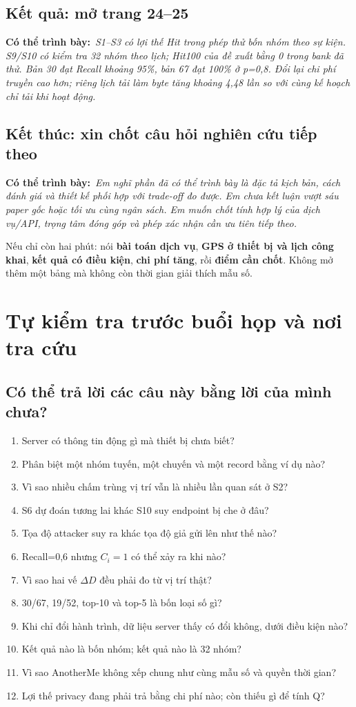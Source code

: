 \documentclass[10pt,a4paper]{article}
\newcommand{\key}[1]{\par\smallskip\noindent\colorbox{pale}{\parbox{\dimexpr\linewidth-2\fboxsep}{#1}}\par\smallskip}
\newcommand{\say}[1]{\par\textbf{Có thể trình bày:}\ \textit{#1}\par}
\newcommand{\guidepage}[1]{\clearpage\section{#1}}
\begin{document}
\subsection*{Kết quả: mở trang 24--25}
\say{S1--S3 có lợi thế Hit trong phép thử bốn nhóm theo sự kiện. S9/S10 có kiểm tra 32 nhóm theo lịch; Hit100 của đề xuất bằng 0 trong bank đã thử. Bản 30 đạt Recall khoảng 95\%, bản 67 đạt 100\% ở p=0,8. Đổi lại chi phí truyền cao hơn; riêng lịch tải làm byte tăng khoảng 4,48 lần so với cùng kế hoạch chỉ tải khi hoạt động.}

\subsection*{Kết thúc: xin chốt câu hỏi nghiên cứu tiếp theo}
\say{Em nghĩ phần đã có thể trình bày là đặc tả kịch bản, cách đánh giá và thiết kế phối hợp với trade-off đo được. Em chưa kết luận vượt sáu paper gốc hoặc tối ưu cùng ngân sách. Em muốn chốt tính hợp lý của dịch vụ/API, trọng tâm đóng góp và phép xác nhận cần ưu tiên tiếp theo.}

\key{Nếu chỉ còn hai phút: nói \textbf{bài toán dịch vụ}, \textbf{GPS ở thiết bị và lịch công khai}, \textbf{kết quả có điều kiện}, \textbf{chi phí tăng}, rồi \textbf{điểm cần chốt}. Không mở thêm một bảng mà không còn thời gian giải thích mẫu số.}

\guidepage{Tự kiểm tra trước buổi họp và nơi tra cứu}
\subsection*{Có thể trả lời các câu này bằng lời của mình chưa?}
\begin{enumerate}
\item Server có thông tin động gì mà thiết bị chưa biết?
\item Phân biệt một nhóm tuyến, một chuyến và một record bằng ví dụ nào?
\item Vì sao nhiều chấm trùng vị trí vẫn là nhiều lần quan sát ở S2?
\item S6 dự đoán tương lai khác S10 suy endpoint bị che ở đâu?
\item Tọa độ attacker suy ra khác tọa độ giả gửi lên như thế nào?
\item Recall=0,6 nhưng $C_i=1$ có thể xảy ra khi nào?
\item Vì sao hai vế $\Delta D$ đều phải đo từ vị trí thật?
\item 30/67, 19/52, top-10 và top-5 là bốn loại số gì?
\item Khi chỉ đổi hành trình, dữ liệu server thấy có đổi không, dưới điều kiện nào?
\item Kết quả nào là bốn nhóm; kết quả nào là 32 nhóm?
\item Vì sao AnotherMe không xếp chung như cùng mẫu số và quyền thời gian?
\item Lợi thế privacy đang phải trả bằng chi phí nào; còn thiếu gì để tính Q?
\end{enumerate}
\end{document}
